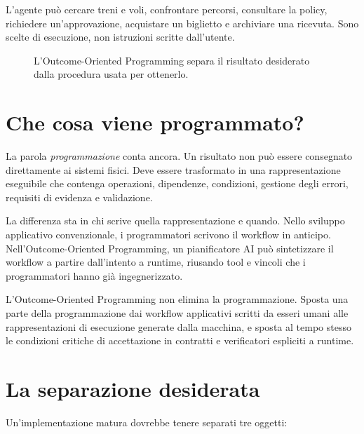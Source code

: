 \documentclass[10pt,oneside,openany]{book}
\newcommand{\keyidea}[1]{%
  \vspace{3pt}
  \noindent\fbox{\begin{minipage}{0.94\linewidth}\small\raggedright\textbf{Idea chiave.} #1\end{minipage}}
  \vspace{3pt}
}
\renewcommand{\keyidea}[1]{\begin{keyideabox}#1\end{keyideabox}}
\begin{document}
L'agente può cercare treni e voli, confrontare percorsi, consultare la policy, richiedere un'approvazione, acquistare un biglietto e archiviare una ricevuta. Sono scelte di esecuzione, non istruzioni scritte dall'utente.

\begin{figure}[ht]
\centering
{}
\caption{L'Outcome-Oriented Programming separa il risultato desiderato dalla procedura usata per ottenerlo.}
\end{figure}

\section{Che cosa viene programmato?}
La parola \emph{programmazione} conta ancora. Un risultato non può essere consegnato direttamente ai sistemi fisici. Deve essere trasformato in una rappresentazione eseguibile che contenga operazioni, dipendenze, condizioni, gestione degli errori, requisiti di evidenza e validazione.

La differenza sta in chi scrive quella rappresentazione e quando. Nello sviluppo applicativo convenzionale, i programmatori scrivono il workflow in anticipo. Nell'Outcome-Oriented Programming, un pianificatore AI può sintetizzare il workflow a partire dall'intento a runtime, riusando tool e vincoli che i programmatori hanno già ingegnerizzato.

\keyidea{L'Outcome-Oriented Programming non elimina la programmazione. Sposta una parte della programmazione dai workflow applicativi scritti da esseri umani alle rappresentazioni di esecuzione generate dalla macchina, e sposta al tempo stesso le condizioni critiche di accettazione in contratti e verificatori espliciti a runtime.}

\section{La separazione desiderata}
Un'implementazione matura dovrebbe tenere separati tre oggetti:
\end{document}

